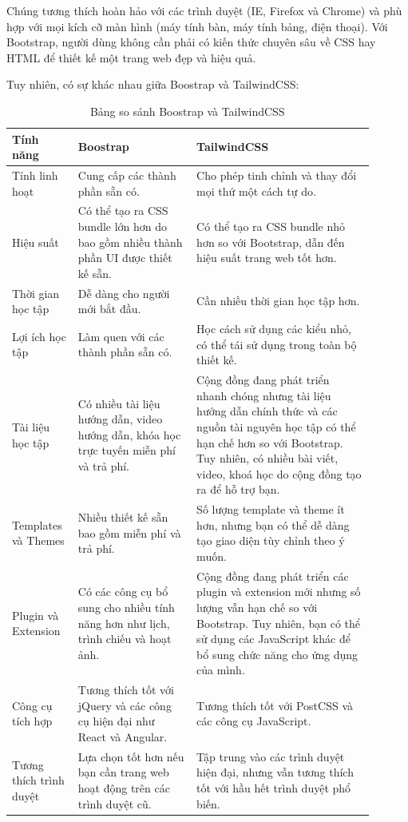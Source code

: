 Chúng tương thích hoàn hảo với các trình duyệt (IE, Firefox và Chrome) và phù hợp với mọi kích cỡ màn hình (máy tính bàn, máy tính bảng, điện thoại). Với Bootstrap, người dùng không cần phải có kiến thức chuyên sâu về CSS hay HTML để thiết kế một trang web đẹp và hiệu quả.

Tuy nhiên, có sự khác nhau giữa Boostrap và TailwindCSS:
\begin{table}[H]

    \centering
    \begin{tabular}{|>{\centering\arraybackslash}p{0.15\linewidth}|>{\centering\arraybackslash}p{0.3\linewidth}|>{\centering\arraybackslash}p{0.45\linewidth}|} \hline 
         Tính năng&  Boostrap& TailwindCSS\\ \hline 
         Tính linh hoạt&  Cung cấp các thành phần sẵn có.& Cho phép tinh chỉnh và thay đổi mọi thứ một cách tự do.\\ \hline 
         Hiệu suất&  Có thể tạo ra CSS bundle lớn hơn do bao gồm nhiều thành phần UI được thiết kế sẵn.& Có thể tạo ra CSS bundle nhỏ hơn so với Bootstrap, dẫn đến hiệu suất trang web tốt hơn.
\\ \hline 
         Thời gian học tập&  Dễ dàng cho người mới bắt đầu.	
& Cần nhiều thời gian học tập hơn.

\\ \hline 
         Lợi ích học tập&  Làm quen với các thành phần sẵn có.	& Học cách sử dụng các kiểu nhỏ, có thể tái sử dụng trong toàn bộ thiết kế.
\\ \hline 
         Tài liệu học tập&  Có nhiều tài liệu hướng dẫn, video hướng dẫn, khóa học trực tuyến miễn phí và trả phí.& 
Cộng đồng đang phát triển nhanh chóng nhưng tài liệu hướng dẫn chính thức và các nguồn tài nguyên học tập có thể hạn chế hơn so với Bootstrap. Tuy nhiên, có nhiều bài viết, video, khoá học do cộng đồng tạo ra để hỗ trợ bạn.
\\ \hline 
         Templates và Themes&  Nhiều thiết kế sẵn bao gồm miễn phí và trả phí.& 
Số lượng template và theme ít hơn, nhưng bạn có thể dễ dàng tạo giao diện tùy chỉnh theo ý muốn.\\ \hline 
         Plugin và Extension&  Có các công cụ bổ sung cho nhiều tính năng hơn như lịch, trình chiếu và hoạt ảnh.& Cộng đồng đang phát triển các plugin và extension mới nhưng số lượng vẫn hạn chế so với Bootstrap. Tuy nhiên, bạn có thể sử dụng các JavaScript khác để bổ sung chức năng cho ứng dụng của mình.\\ \hline 
         Công cụ tích hợp&  Tương thích tốt với jQuery và các công cụ hiện đại như React và Angular.& Tương thích tốt với PostCSS và các công cụ JavaScript.\\ \hline 
         Tương thích trình duyệt&  Lựa chọn tốt hơn nếu bạn cần trang web hoạt động trên các trình duyệt cũ. & 
Tập trung vào các trình duyệt hiện đại, nhưng vẫn tương thích tốt với hầu hết trình duyệt phổ biến.
\\ \hline
    \end{tabular}
    \caption{Bảng so sánh Boostrap và TailwindCSS}
    \label{tab:TailwindCSS}
\end{table}


